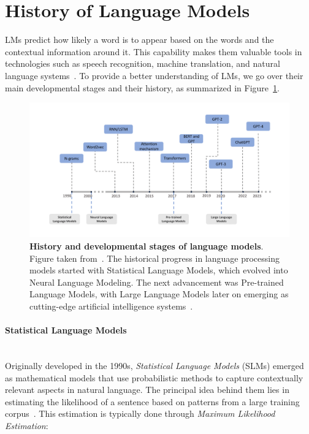 \documentclass{DESSThesis}
\begin{document}
\section{History of Language Models}

LMs predict how likely a word is to appear based on the words and the contextual information around it. This capability makes them valuable tools in technologies such as speech recognition, machine translation, and natural language systems~\cite{lau1994adaptive}. To provide a better understanding of LMs, we go over their main developmental stages and their history, as summarized in Figure~\ref{fig:history}. 

\begin{figure}[H]
    \centering
    \includegraphics[width=1\linewidth]{img/Large Language Models and RAG/history.png}
    \caption[History and developmental stages of language models]{\textbf{History and developmental stages of language models}. Figure taken from~\cite{wang2024historydevelopmentprincipleslarge}. The historical progress in language processing models started with Statistical Language Models, which evolved into Neural Language Modeling. The next advancement was Pre-trained Language Models, with Large Language Models later on emerging as cutting-edge artificial intelligence systems~\cite{naveed2024comprehensiveoverviewlargelanguage}.}
    \label{fig:history}
\end{figure}

\paragraph{Statistical Language Models}\mbox{}\\

\noindent Originally developed in the 1990s, \emph{Statistical Language Models} (SLMs) emerged as mathematical models that use probabilistic methods to capture contextually relevant aspects in natural language. The principal idea behind them lies in estimating the likelihood of a sentence based on patterns from a large training corpus~\cite{wang2024historydevelopmentprincipleslarge, lau1994adaptive}. This estimation is typically done through \emph{Maximum Likelihood Estimation}:
\end{document}
